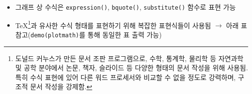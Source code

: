 \documentclass[
  11pt,
]{krantz}
\makeatletter
\providecommand{\tightlist}{%
  \setlength{\itemsep}{0pt}\setlength{\parskip}{0pt}}
\newenvironment{kframe}{%
\medskip{}
\setlength{\fboxsep}{.8em}
 \def\at@end@of@kframe{}%
 \ifinner\ifhmode%
  \def\at@end@of@kframe{\end{minipage}}%
  \begin{minipage}{\columnwidth}%
 \fi\fi%
 \def\FrameCommand##1{\hskip\@totalleftmargin \hskip-\fboxsep
 \colorbox{shadecolor}{##1}\hskip-\fboxsep
     \hskip-\linewidth \hskip-\@totalleftmargin \hskip\columnwidth}%
 \MakeFramed {\advance\hsize-\width
   \@totalleftmargin\z@ \linewidth\hsize
   \@setminipage}}%
 {\par\unskip\endMakeFramed%
 \at@end@of@kframe}
\renewenvironment{quote}{\begin{kframe}}{\end{kframe}}
\makeatother
\begin{document}
\begin{quote}
\begin{itemize}
\tightlist
\item
  그래프 상 수식은 \texttt{expression()}, \texttt{bquote()}, \texttt{substitute()} 함수로 표현 가능
\item
  TeX\footnote{도널드 커누스가 만든 문서 조판 프로그램으로, 수학, 통계학, 물리학 등 자연과학 및 공학 분야에서 논문, 책자, 슬라이드 등 다양한 형태의 문서 작성을 위해 사용됨. 특히 수식 표현에 있어 다른 워드 프로세서와 비교할 수 없을 정도로 강력하며, 구조적 문서 작성을 강제함.}과 유사한 수식 형태를 표현하기 위해 복잡한 표현식들이 사용됨 \(\rightarrow\) 아래 표 참고(\texttt{demo(plotmath)}를 통해 동일한 표 출력 가능)
\end{itemize}
\end{quote}

\footnotesize
\end{document}
